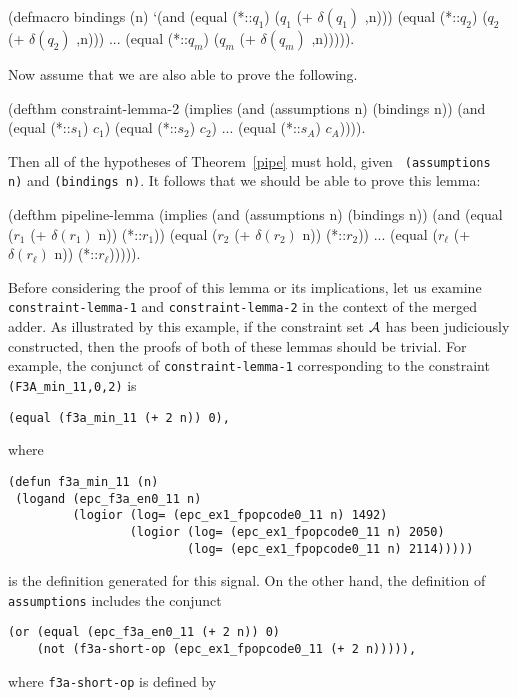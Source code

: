 \documentclass{article}
\begin{document}
\begin{acl2}
(defmacro bindings (n)
  `(and (equal (*::$q_1$) ($q_1$ (+ $\delta(q_1)$ ,n)))
        (equal (*::$q_2$) ($q_2$ (+ $\delta(q_2)$ ,n)))
        ...
        (equal (*::$q_{m}$) ($q_{m}$ (+ $\delta(q_{m})$ ,n))))).
\end{acl2}\noindent
Now assume that we are also able to prove the following.\medskip

\begin{acl2}
(defthm constraint-lemma-2
  (implies (and (assumptions n) (bindings n))
           (and (equal (*::$s_1$) $c_1$)
                (equal (*::$s_2$) $c_2$)
                ...
                (equal (*::$s_A$) $c_A$)))).
\end{acl2}\noindent
Then all of the hypotheses of Theorem~\ref{pipe} must hold, given {\tt
(assumptions n)} and {\tt (bindings n)}.  It follows that we should be
able to prove this lemma:\medskip

\begin{acl2}
(defthm pipeline-lemma
  (implies (and (assumptions n) (bindings n))
           (and (equal ($r_1$ (+ $\delta(r_1)$ n)) (*::$r_1$))
                (equal ($r_2$ (+ $\delta(r_2)$ n)) (*::$r_2$))
                ...
                (equal ($r_\ell$ (+ $\delta(r_\ell)$ n)) (*::$r_\ell$))))).
\end{acl2}\noindent
Before considering the proof of this lemma or its implications, let us examine
{\tt constraint-lemma-1} and {\tt constraint-lemma-2} in the context of the
merged adder.  As illustrated by this example, if the constraint set ${\cal A}$
has been judiciously constructed, then the proofs of both of these lemmas
should be trivial.  For example, the conjunct of {\tt constraint-lemma-1}
corresponding to the constraint \verb!(F3A_min_11,0,2)! is
\begin{verbatim}
(equal (f3a_min_11 (+ 2 n)) 0),
\end{verbatim}
where
\begin{verbatim}
(defun f3a_min_11 (n)
 (logand (epc_f3a_en0_11 n)
         (logior (log= (epc_ex1_fpopcode0_11 n) 1492)
                 (logior (log= (epc_ex1_fpopcode0_11 n) 2050)
                         (log= (epc_ex1_fpopcode0_11 n) 2114)))))
\end{verbatim}
is the definition generated for this signal.
On the other hand, the definition of {\tt assumptions} includes the
conjunct
\begin{verbatim}
(or (equal (epc_f3a_en0_11 (+ 2 n)) 0)
    (not (f3a-short-op (epc_ex1_fpopcode0_11 (+ 2 n))))),
\end{verbatim}
where {\tt f3a-short-op} is defined by\medskip
\end{document}
